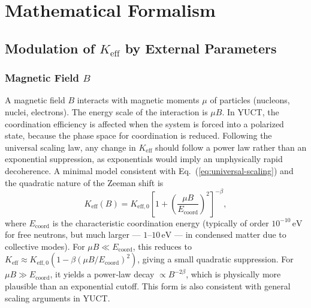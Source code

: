 \documentclass[12pt]{article}
\theoremstyle{remark}
\newcommand{\Keff}{K_{\mathrm{eff}}}
\newcommand{\Keffzero}{K_{\mathrm{eff},0}}
\begin{document}
	\section{Mathematical Formalism}
	\label{sec:math}
	
	\subsection{Modulation of \(\Keff\) by External Parameters}
	
	\subsubsection{Magnetic Field \(B\)}
	
	A magnetic field \(B\) interacts with magnetic moments \(\mu\) of particles (nucleons, nuclei, electrons). The energy scale of the interaction is \(\mu B\). In YUCT, the coordination efficiency is affected when the system is forced into a polarized state, because the phase space for coordination is reduced. Following the universal scaling law, any change in \(\Keff\) should follow a power law rather than an exponential suppression, as exponentials would imply an unphysically rapid decoherence. A minimal model consistent with Eq.~(\ref{eq:universal-scaling}) and the quadratic nature of the Zeeman shift is
	\begin{equation}
		\Keff(B) = \Keffzero \left[ 1 + \left( \frac{\mu B}{E_{\mathrm{coord}}} \right)^2 \right]^{-\beta},
		\label{eq:keff-B}
	\end{equation}
	where \(E_{\mathrm{coord}}\) is the characteristic coordination energy (typically of order \(10^{-10}\,\text{eV}\) for free neutrons, but much larger — \(1\)–\(10\,\text{eV}\) — in condensed matter due to collective modes). For \(\mu B \ll E_{\mathrm{coord}}\), this reduces to \(\Keff \approx \Keffzero (1 - \beta (\mu B/E_{\mathrm{coord}})^2)\), giving a small quadratic suppression. For \(\mu B \gg E_{\mathrm{coord}}\), it yields a power‑law decay \(\propto B^{-2\beta}\), which is physically more plausible than an exponential cutoff. This form is also consistent with general scaling arguments in YUCT.
	
\end{document}
